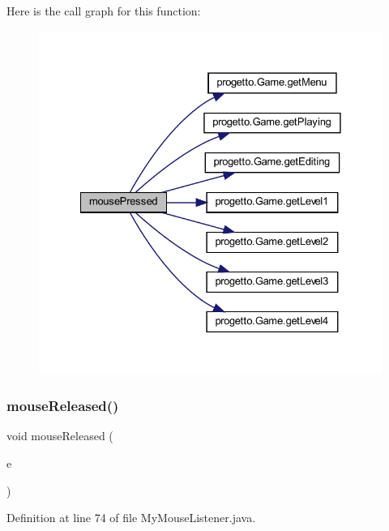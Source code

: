 Here is the call graph for this function\+:\nopagebreak
\begin{figure}[H]
\begin{center}
\leavevmode
\includegraphics[width=328pt]{classinputs_1_1_my_mouse_listener_aed82e1ce3dd3cf283d508c3ba3be70ef_cgraph}
\end{center}
\end{figure}
\mbox{\label{classinputs_1_1_my_mouse_listener_a87a07291794e15052db67f945d90853e}} 
\subsubsection{\texorpdfstring{mouse\+Released()}{mouseReleased()}}
{\footnotesize\ttfamily void mouse\+Released (\begin{DoxyParamCaption}\item[{Mouse\+Event}]{e }\end{DoxyParamCaption})}



Definition at line 74 of file My\+Mouse\+Listener.\+java.


